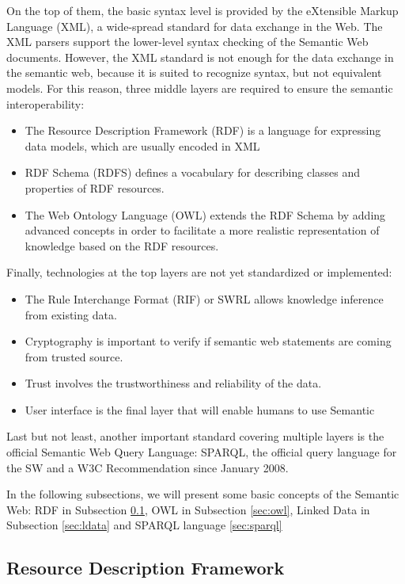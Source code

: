 On the top of them, the basic syntax level is provided by the eXtensible Markup Language (XML), a wide-spread standard for data exchange in the Web. The XML parsers support the lower-level syntax checking of the Semantic Web documents. However, the XML standard is not enough for the data exchange in the semantic web, because it is suited to recognize syntax, but not equivalent models. For this reason, three middle layers are required to ensure the semantic interoperability:
\begin{itemize}
\item The Resource Description Framework (RDF) is a language for expressing data models, which are usually encoded in XML
\item RDF Schema (RDFS) defines a vocabulary for describing classes and properties of RDF resources.
\item The Web Ontology Language (OWL) extends the RDF Schema by adding advanced concepts in order to facilitate a more realistic representation of knowledge based on the RDF resources.
\end{itemize} 

Finally, technologies at the top layers are not yet standardized or implemented:
\begin{itemize}
\item The Rule Interchange Format (RIF) or SWRL allows knowledge inference from existing data.
\item Cryptography is important to verify if semantic web statements are coming from trusted source.
\item Trust involves the trustworthiness and reliability of the data.
\item User interface is the final layer that will enable humans to use Semantic
\end{itemize} 

Last but not least, another important standard covering multiple layers is the official Semantic Web Query Language: SPARQL,  the official query language for the SW and a W3C Recommendation since January 2008. 

In the following subsections, we will present some basic concepts of the Semantic Web:  RDF in Subsection \ref{sec:rdf},  OWL in Subsection \ref{sec:owl}, Linked Data in Subsection \ref{sec:ldata} and SPARQL language \ref{sec:sparql}

\subsection{Resource Description Framework}\label{sec:rdf}

